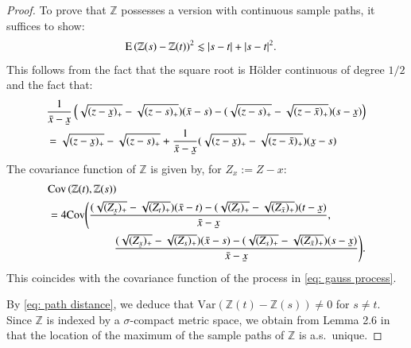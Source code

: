\begin{proof}
To prove that $\mathbb{Z}$ possesses a version with continuous sample paths, it suffices to show:
\begin{align}\label{eq: path distance}
    &\mathrm{E} \left( \mathbb{Z} (s) - \mathbb{Z} (t) \right)^2   \lesssim |s - t| + |s - t|^2.
\end{align}
This follows from the fact that the square root is Hölder continuous of degree $1/2$ and the fact that:  
\begin{align*}
    &\frac{1}{\bar{x}-\ubar{x}} \left(\sqrt{(z-\ubar{x})_{+}} - \sqrt{(z-s)_{+}})(\bar{x}-s) - ( \sqrt{(z-s)_{+}} - \sqrt{(z-\bar{x})_{+}})(s-\ubar{x}) \right) \\
    &= \sqrt{(z-\ubar{x})_{+}} - \sqrt{(z-s)_{+}} + \frac{1}{\bar{x}-\ubar{x}} (\sqrt{(z-\ubar{x})_{+}} - \sqrt{(z-\bar{x})_{+}})(\ubar{x}-s)
\end{align*}
The covariance function of $\mathbb{Z}$ is given by, for $Z_x := Z -x$:
\begin{align*}
       &\mathrm{Cov} \left( \mathbb{Z}(t),\mathbb{Z}(s) \right)  \\
       &= 4\mathrm{Cov} \Bigg( \frac{(\sqrt{\smash[b]{(Z_{\ubar{x}})}_{+}} - \sqrt{(Z_t)_{+}})(\bar{x}-t) - (\sqrt{(Z_t)_{+}} - \sqrt{(Z_{\bar{x}})_{+}} )(t-\ubar{x})}{\bar{x} - \ubar{x}}, \\
        &\quad \quad \quad \quad \quad \quad  \frac{(\sqrt{\smash[b]{(Z_{\ubar{x}})}_{+}} - \sqrt{(Z_s)_{+}})(\bar{x}-s) - (\sqrt{(Z_s)_{+}} - \sqrt{(Z_{\bar{x}})_{+}} )(s-\ubar{x})}{\bar{x} - \ubar{x}} \Bigg).
\end{align*}
This coincides with the covariance function of the process in \eqref{eq: gauss process}.

By \eqref{eq: path distance}, we deduce that $\mathrm{Var}(\mathbb{Z}(t) - \mathbb{Z}(s)) \neq 0$ for $s \neq t$. Since $\mathbb{Z}$ is indexed by a $\sigma$-compact metric space, we obtain from Lemma 2.6 in \cite{12} that the location of the maximum of the sample paths of $\mathbb{Z}$ is a.s.\ unique. 
\end{proof}

